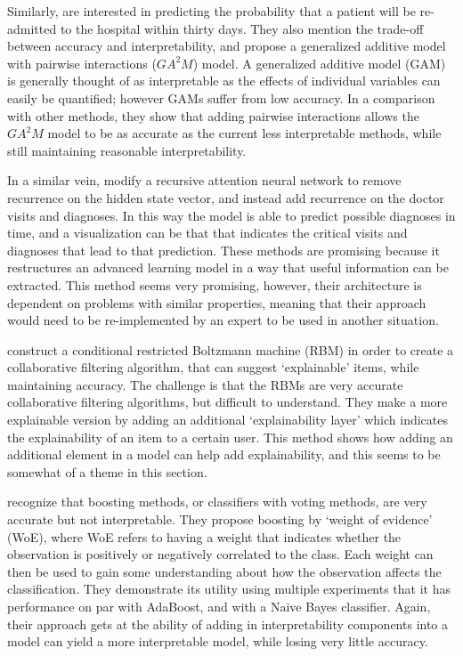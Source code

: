     Similarly, \citet{Caruana2015-za} are interested in predicting the probability that a patient will be re-admitted to the hospital within thirty days. They also mention the trade-off between accuracy and interpretability, and propose a generalized additive model with pairwise interactions ($GA^2M$) model. A generalized additive model (GAM) is generally thought of as interpretable as the effects of individual variables can easily be quantified; however GAMs suffer from low accuracy. In a comparison with other methods, they show that adding pairwise interactions allows the $GA^2M$ model to be as accurate as the current less interpretable methods, while still maintaining reasonable interpretability.

    In a similar vein, \citet{Choi2016-by} modify a recursive attention neural network to remove recurrence on the hidden state vector, and instead add recurrence on the doctor visits and diagnoses. In this way the model is able to predict possible diagnoses in time, and a visualization can be that that indicates the critical visits and diagnoses that lead to that prediction. These methods are promising because it restructures an advanced learning model in a way that useful information can be extracted. This method seems very promising, however, their architecture is dependent on problems with similar properties, meaning that their approach would need to be re-implemented by an expert to be used in another situation.

    \citet{Abdollahi2016-vn} construct a conditional restricted Boltzmann machine (RBM) in order to create a collaborative filtering algorithm, that can suggest `explainable' items, while maintaining accuracy. The challenge is that the RBMs are very accurate collaborative filtering algorithms, but difficult to understand. They make a more explainable version by adding an additional `explainability layer' which indicates the explainability of an item to a certain user. This method shows how adding an additional element in a model can help add explainability, and this seems to be somewhat of a theme in this section.

    \citet{Ridgeway1998-lv} recognize that boosting methods, or classifiers with voting methods, are very accurate but not interpretable. They propose boosting by `weight of evidence' (WoE), where WoE refers to having a weight that indicates whether the observation is positively or negatively correlated to the class. Each weight can then be used to gain some understanding about how the observation affects the classification. They demonstrate its utility using multiple experiments that it has performance on par with AdaBoost, and with a Naive Bayes classifier.  Again, their approach gets at the ability of adding in interpretability components into a model can yield a more interpretable model, while losing very little accuracy.

